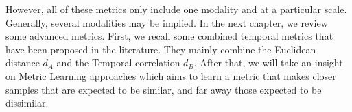 However, all of these metrics only include one modality and at a particular scale. Generally, several modalities may be implied. In the next chapter, we review some advanced metrics. First, we recall some combined temporal metrics that have been proposed in the literature. They mainly combine the Euclidean distance $d_A$ and the Temporal correlation $d_B$. After that, we will take an insight on Metric Learning approaches which aims to learn a metric that makes closer samples that are expected to be similar, and far away those expected to be dissimilar.







